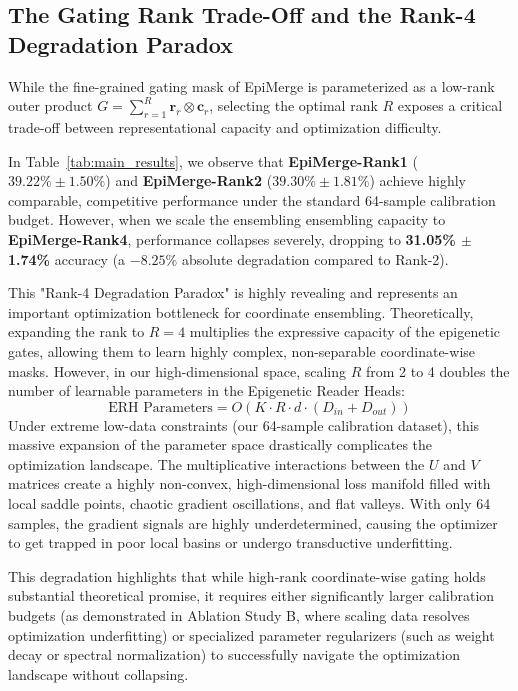 \subsection{The Gating Rank Trade-Off and the Rank-4 Degradation Paradox}
While the fine-grained gating mask of EpiMerge is parameterized as a low-rank outer product $G = \sum_{r=1}^R \mathbf{r}_r \otimes \mathbf{c}_r$, selecting the optimal rank $R$ exposes a critical trade-off between representational capacity and optimization difficulty.

In Table~\ref{tab:main_results}, we observe that \textbf{EpiMerge-Rank1} ($39.22\% \pm 1.50\%$) and \textbf{EpiMerge-Rank2} ($39.30\% \pm 1.81\%$) achieve highly comparable, competitive performance under the standard 64-sample calibration budget. However, when we scale the ensembling ensembling capacity to \textbf{EpiMerge-Rank4}, performance collapses severely, dropping to \textbf{31.05\% $\pm$ 1.74\%} accuracy (a $-8.25\%$ absolute degradation compared to Rank-2).

This "Rank-4 Degradation Paradox" is highly revealing and represents an important optimization bottleneck for coordinate ensembling. Theoretically, expanding the rank to $R=4$ multiplies the expressive capacity of the epigenetic gates, allowing them to learn highly complex, non-separable coordinate-wise masks. However, in our high-dimensional space, scaling $R$ from 2 to 4 doubles the number of learnable parameters in the Epigenetic Reader Heads:
\begin{equation}
    \text{ERH Parameters} = O(K \cdot R \cdot d \cdot (D_{in} + D_{out}))
\end{equation}
Under extreme low-data constraints (our 64-sample calibration dataset), this massive expansion of the parameter space drastically complicates the optimization landscape. The multiplicative interactions between the $U$ and $V$ matrices create a highly non-convex, high-dimensional loss manifold filled with local saddle points, chaotic gradient oscillations, and flat valleys. With only 64 samples, the gradient signals are highly underdetermined, causing the optimizer to get trapped in poor local basins or undergo transductive underfitting.

This degradation highlights that while high-rank coordinate-wise gating holds substantial theoretical promise, it requires either significantly larger calibration budgets (as demonstrated in Ablation Study B, where scaling data resolves optimization underfitting) or specialized parameter regularizers (such as weight decay or spectral normalization) to successfully navigate the optimization landscape without collapsing.

